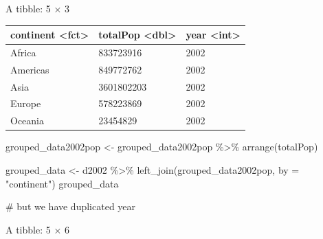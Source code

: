 \documentclass[
  letterpaper,
  DIV=11,
  numbers=noendperiod]{scrreprt}
\newenvironment{Shaded}{\begin{snugshade}}{\end{snugshade}}
\newcommand{\AttributeTok}[1]{\textcolor[rgb]{0.40,0.45,0.13}{#1}}
\newcommand{\CommentTok}[1]{\textcolor[rgb]{0.37,0.37,0.37}{#1}}
\newcommand{\FunctionTok}[1]{\textcolor[rgb]{0.28,0.35,0.67}{#1}}
\newcommand{\NormalTok}[1]{\textcolor[rgb]{0.00,0.23,0.31}{#1}}
\newcommand{\OtherTok}[1]{\textcolor[rgb]{0.00,0.23,0.31}{#1}}
\newcommand{\SpecialCharTok}[1]{\textcolor[rgb]{0.37,0.37,0.37}{#1}}
\newcommand{\StringTok}[1]{\textcolor[rgb]{0.13,0.47,0.30}{#1}}
\begin{document}
A tibble: 5 × 3

\begin{longtable}[]{@{}lll@{}}
\toprule\noalign{}
continent \textless fct\textgreater{} & totalPop
\textless dbl\textgreater{} & year \textless int\textgreater{} \\
\midrule\noalign{}
\endhead
\bottomrule\noalign{}
\endlastfoot
Africa & 833723916 & 2002 \\
Americas & 849772762 & 2002 \\
Asia & 3601802203 & 2002 \\
Europe & 578223869 & 2002 \\
Oceania & 23454829 & 2002 \\
\end{longtable}

\begin{Shaded}
\begin{Highlighting}[]
\NormalTok{grouped\_data2002pop }\OtherTok{\textless{}{-}}\NormalTok{ grouped\_data2002pop }\SpecialCharTok{\%\textgreater{}\%} 
    \FunctionTok{arrange}\NormalTok{(totalPop)}

\NormalTok{grouped\_data }\OtherTok{\textless{}{-}}\NormalTok{ d2002 }\SpecialCharTok{\%\textgreater{}\%} 
    \FunctionTok{left\_join}\NormalTok{(grouped\_data2002pop, }\AttributeTok{by =} \StringTok{"continent"}\NormalTok{)}
\NormalTok{grouped\_data}

\CommentTok{\# but we have duplicated year}
\end{Highlighting}
\end{Shaded}

A tibble: 5 × 6
\end{document}
